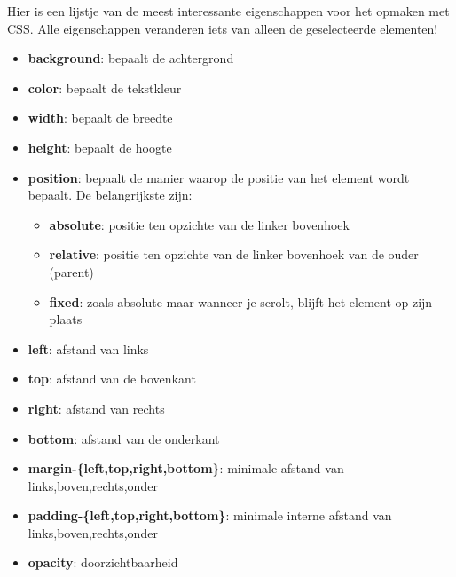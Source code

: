 Hier is een lijstje van de meest interessante eigenschappen voor het opmaken met
CSS. Alle eigenschappen veranderen iets van alleen de geselecteerde elementen!
\begin{itemize}
    \item \textbf{background}: bepaalt de achtergrond
    \item \textbf{color}: bepaalt de tekstkleur
    \item \textbf{width}: bepaalt de breedte
    \item \textbf{height}: bepaalt de hoogte
    \item \textbf{position}: bepaalt de manier waarop de positie van het
        element wordt bepaalt. De belangrijkste zijn:
        \begin{itemize}
            \item \textbf{absolute}: positie ten opzichte van de linker bovenhoek
            \item \textbf{relative}: positie ten opzichte van de linker
                bovenhoek van de ouder (parent)
            \item \textbf{fixed}: zoals absolute maar wanneer je scrolt, blijft
                het element op zijn plaats
        \end{itemize}
    \item \textbf{left}: afstand van links
    \item \textbf{top}: afstand van de bovenkant
    \item \textbf{right}: afstand van rechts
    \item \textbf{bottom}: afstand van de onderkant
    \item \textbf{margin-\{left,top,right,bottom\}}: minimale afstand van
        links,boven,rechts,onder
    \item \textbf{padding-\{left,top,right,bottom\}}: minimale interne afstand
        van links,boven,rechts,onder
    \item \textbf{opacity}: doorzichtbaarheid
\end{itemize}


